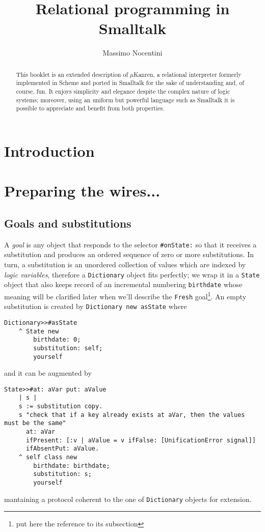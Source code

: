 \documentclass[a4paper,12pt]{article}
\author{Massimo Nocentini}
\title{Relational programming in Smalltalk}
\newcommand{\stcode}[1]{\texttt{#1}}
\begin{document}
\maketitle

\begin{abstract}
This booklet is an extended description of $\mu$Kanren, a relational
interpreter formerly implemented in Scheme and ported in Smalltalk for the sake
of understanding and, of course, fun. It enjoys simplicity and elegance despite
the complex nature of logic systems; moreover, using an uniform but powerful
language such as Smalltalk it is possible to appreciate and benefit from both
properties.
\end{abstract}

\section*{Introduction}



\tableofcontents

\section{Preparing the wires...}

\subsection{Goals and substitutions}

A \textit{goal} is any object that responds to the selector \Verb|#onState:| so
that it receives a substitution and produces an ordered sequence of zero or
more substitutions. In turn, a substitution is an unordered collection of
values which are indexed by \textit{logic variables}, therefore a
\Verb|Dictionary| object fits perfectly; we wrap it in a \Verb|State| object
that also keeps record of an incremental numbering \Verb|birthdate| whose
meaning will be clarified later when we'll describe the \Verb|Fresh|
goal\footnote{put here the reference to its subsection}. An empty substitution
is created by \stcode{Dictionary new asState} where
\begin{verbatim}
Dictionary>>#asState
    ^ State new 
        birthdate: 0;
        substitution: self;
        yourself
\end{verbatim}
and it can be augmented by
\begin{verbatim}
State>>#at: aVar put: aValue 
    | s |
    s := substitution copy.
    s "check that if a key already exists at aVar, then the values must be the same"
      at: aVar
      ifPresent: [:v | aValue = v ifFalse: [UnificationError signal]]
      ifAbsentPut: aValue.
    ^ self class new 
        birthdate: birthdate;
        substitution: s;
        yourself
\end{verbatim}
mantaining a protocol coherent to the one of \Verb|Dictionary| objects for
extension.
\end{document}
